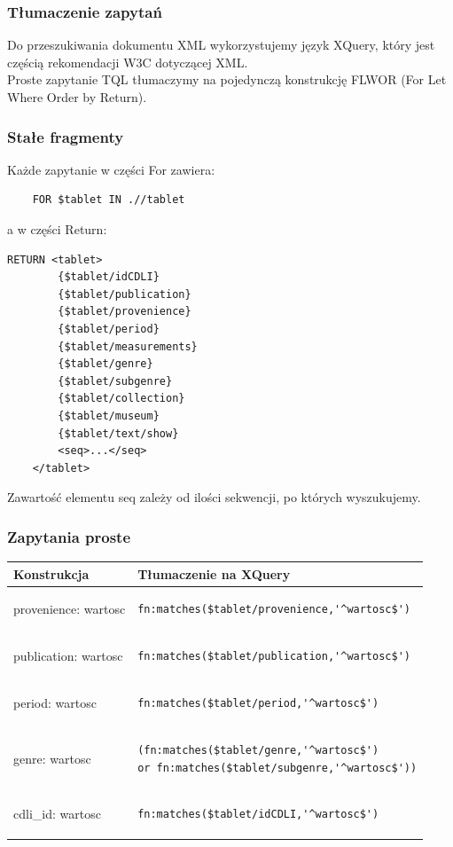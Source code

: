 \subsubsection{Tłumaczenie zapytań}
Do przeszukiwania dokumentu XML wykorzystujemy język XQuery, który jest częścią rekomendacji W3C dotyczącej XML.\\
Proste zapytanie TQL tłumaczymy na pojedynczą konstrukcję FLWOR (For Let Where Order by Return).\\

\subsubsection{Stałe fragmenty}
Każde zapytanie w części For zawiera:
	\begin{verbatim}
	FOR $tablet IN .//tablet
\end{verbatim}
a w części Return:
  \begin{verbatim}RETURN <tablet>
		{$tablet/idCDLI}
		{$tablet/publication}
		{$tablet/provenience}
		{$tablet/period}
		{$tablet/measurements}
		{$tablet/genre}
		{$tablet/subgenre}
		{$tablet/collection}
		{$tablet/museum}
		{$tablet/text/show}
		<seq>...</seq>
	</tablet>
\end{verbatim}
Zawartość elementu seq zależy od ilości sekwencji, po których wyszukujemy. 

\subsubsection{Zapytania proste}

\begin{longtable}{|p{2.5in}|p{3.5in}|}
\hline
{\bf Konstrukcja} & {\bf Tłumaczenie na XQuery}\\
\hline
\endhead
provenience: wartosc & \begin{verbatim}fn:matches($tablet/provenience,'^wartosc$')\end{verbatim}
\\
\hline
publication: wartosc & \begin{verbatim}fn:matches($tablet/publication,'^wartosc$')\end{verbatim}
\\
\hline
period: wartosc & \begin{verbatim}fn:matches($tablet/period,'^wartosc$')\end{verbatim}
\\
\hline
genre: wartosc & \begin{verbatim}(fn:matches($tablet/genre,'^wartosc$')
or fn:matches($tablet/subgenre,'^wartosc$'))\end{verbatim}
\\
\hline
cdli\_id: wartosc & \begin{verbatim}fn:matches($tablet/idCDLI,'^wartosc$')\end{verbatim}
\\
\hline
\end{longtable}


